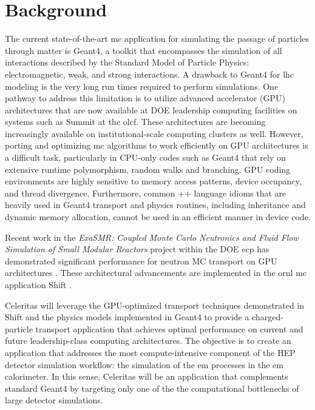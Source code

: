 \documentclass[10pt]{article}
\begin{document}
\section*{Background}

The current state-of-the-art \ac{mc} application for simulating
the passage of particles through matter is Geant4, a toolkit
that encompasses the simulation of all interactions described by the Standard
Model of Particle Physics: electromagnetic, weak, and strong
interactions. A drawback to Geant4 for \ac{lhc} modeling is the very long run
times required to perform simulations. One pathway to address this
limitation is to utilize advanced accelerator (GPU) architectures that
are now available at DOE leadership computing facilities on systems such
as Summit at the \ac{olcf}. These architectures are becoming increasingly
available on institutional-scale computing clusters as well. However,
porting and optimizing \ac{mc} algorithms to work efficiently on GPU
architectures is a difficult task, particularly in CPU-only codes such
as Geant4 that rely on extensive runtime polymorphism, random walks and branching.
GPU coding environments are highly sensitive to memory access patterns, device
occupancy, and thread divergence. Furthermore, common \C++ language
idioms that are heavily used in Geant4 transport and physics routines,
including inheritance and dynamic memory allocation, cannot be used in an
efficient manner in device code.

Recent work in the \emph{ExaSMR: Coupled Monte Carlo Neutronics and
Fluid Flow Simulation of Small Modular Reactors} project within the DOE
\ac{ecp} \cite{ecp2019} has
demonstrated significant performance for neutron MC transport on GPU
architectures \cite{hamilton_continuous-energy_2019}. These architectural
advancements are implemented in the \ac{ornl} \ac{mc} application Shift
\cite{pandya_implementation_2016}.

Celeritas will leverage the GPU-optimized transport techniques demonstrated
in Shift and the physics models implemented in Geant4
to provide a charged-particle
transport application that achieves optimal performance on current and
future leadership-class computing architectures. The objective is to
create an application that addresses the most compute-intensive
component of the HEP detector simulation workflow: the simulation of the \ac{em} processes in the \ac{em} calorimeter.
In this sense, Celeritas will be an application that complements standard
Geant4 by targeting only one of the the computational bottlenecks of large detector simulations.
\end{document}
